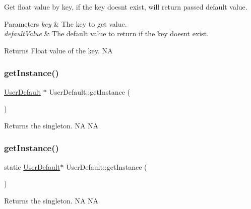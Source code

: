 Get float value by key, if the key doesn\textquotesingle{}t exist, will return passed default value. 
\begin{DoxyParams}{Parameters}
{\em key} & The key to get value. \\
\hline
{\em default\+Value} & The default value to return if the key doesn\textquotesingle{}t exist. \\
\hline
\end{DoxyParams}
\begin{DoxyReturn}{Returns}
Float value of the key.  NA 
\end{DoxyReturn}
\mbox{\label{classUserDefault_a0885d10cb5187584d49d245594a43b8c}} 
\subsubsection{\texorpdfstring{get\+Instance()}{getInstance()}\hspace{0.1cm}{\footnotesize\ttfamily [1/2]}}
{\footnotesize\ttfamily \hyperlink{classUserDefault}{User\+Default} $\ast$ User\+Default\+::get\+Instance (\begin{DoxyParamCaption}{ }\end{DoxyParamCaption})\hspace{0.3cm}{\ttfamily [static]}}

Returns the singleton.  NA  NA \mbox{\label{classUserDefault_a4bf4cf202def99246208d080a3918875}} 
\subsubsection{\texorpdfstring{get\+Instance()}{getInstance()}\hspace{0.1cm}{\footnotesize\ttfamily [2/2]}}
{\footnotesize\ttfamily static \hyperlink{classUserDefault}{User\+Default}$\ast$ User\+Default\+::get\+Instance (\begin{DoxyParamCaption}{ }\end{DoxyParamCaption})\hspace{0.3cm}{\ttfamily [static]}}

Returns the singleton.  NA  NA \mbox{\label{classUserDefault_a76088fadfecbeaf693c002d5bdb8c622}} 
